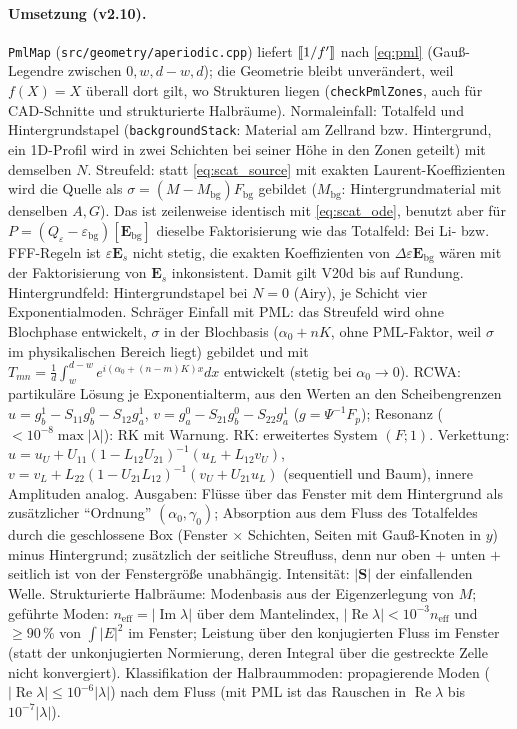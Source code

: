 \paragraph{Umsetzung (v2.10).} \verb|PmlMap| (\verb|src/geometry/aperiodic.cpp|) liefert $[\![1/f']\!]$ nach
\eqref{eq:pml} (Gauß-Legendre zwischen $0,w,d-w,d$); die Geometrie bleibt unverändert, weil $f(X)=X$ überall dort gilt,
wo Strukturen liegen (\verb|checkPmlZones|, auch für CAD-Schnitte und strukturierte Halbräume). Normaleinfall:
Totalfeld und Hintergrundstapel (\verb|backgroundStack|: Material am Zellrand bzw. Hintergrund, ein 1D-Profil wird
in zwei Schichten bei seiner Höhe in den Zonen geteilt) mit demselben $N$. Streufeld: statt \eqref{eq:scat_source} mit
exakten Laurent-Koeffizienten wird die Quelle als $\sigma=(M-M_{\text{bg}})F_{\text{bg}}$ gebildet ($M_{\text{bg}}$:
Hintergrundmaterial mit denselben $A,G$). Das ist zeilenweise identisch mit \eqref{eq:scat_ode}, benutzt aber für
$P=(Q_\varepsilon-\varepsilon_{\text{bg}})[\mathbf E_{\text{bg}}]$ dieselbe Faktorisierung wie das Totalfeld: Bei Li- bzw.
FFF-Regeln ist $\varepsilon\mathbf E_s$ nicht stetig, die exakten Koeffizienten von $\Delta\varepsilon\mathbf E_{\text{bg}}$
wären mit der Faktorisierung von $\mathbf E_s$ inkonsistent. Damit gilt V20d bis auf Rundung. Hintergrundfeld:
Hintergrundstapel bei $N=0$ (Airy), je Schicht vier Exponentialmoden. Schräger Einfall mit PML: das Streufeld wird
ohne Blochphase entwickelt, $\sigma$ in der Blochbasis ($\alpha_0+nK$, ohne PML-Faktor, weil $\sigma$ im physikalischen
Bereich liegt) gebildet und mit $T_{mn}=\frac1d\int_w^{d-w}e^{i(\alpha_0+(n-m)K)x}dx$ entwickelt (stetig bei
$\alpha_0\to0$). RCWA: partikuläre Lösung je Exponentialterm, aus den Werten an den Scheibengrenzen
$u=g^1_b-S_{11}g^0_b-S_{12}g^1_a$, $v=g^0_a-S_{21}g^0_b-S_{22}g^1_a$ ($g=\Psi^{-1}F_p$); Resonanz ($<10^{-8}\max|\lambda|$):
RK mit Warnung. RK: erweitertes System $(F;1)$. Verkettung: $u=u_U+U_{11}(1-L_{12}U_{21})^{-1}(u_L+L_{12}v_U)$,
$v=v_L+L_{22}(1-U_{21}L_{12})^{-1}(v_U+U_{21}u_L)$ (sequentiell und Baum), innere Amplituden analog. Ausgaben: Flüsse über das
Fenster mit dem Hintergrund als zusätzlicher \enquote{Ordnung} $(\alpha_0,\gamma_0)$; Absorption aus dem Fluss des
Totalfeldes durch die geschlossene Box (Fenster $\times$ Schichten, Seiten mit Gauß-Knoten in $y$) minus Hintergrund;
zusätzlich der seitliche Streufluss, denn nur oben $+$ unten $+$ seitlich ist von der Fenstergröße unabhängig.
Intensität: $|\mathbf S|$ der einfallenden Welle. Strukturierte Halbräume: Modenbasis aus der Eigenzerlegung von $M$;
geführte Moden: $n_{\text{eff}}=|\operatorname{Im}\lambda|$ über dem Mantelindex, $|\operatorname{Re}\lambda|<10^{-3}n_{\text{eff}}$
und $\ge90\,\%$ von $\int|E|^2$ im Fenster; Leistung über den konjugierten Fluss im Fenster (statt der unkonjugierten
Normierung, deren Integral über die gestreckte Zelle nicht konvergiert). Klassifikation der Halbraummoden: propagierende
Moden ($|\operatorname{Re}\lambda|\le10^{-6}|\lambda|$) nach dem Fluss (mit PML ist das Rauschen in
$\operatorname{Re}\lambda$ bis $10^{-7}|\lambda|$).

